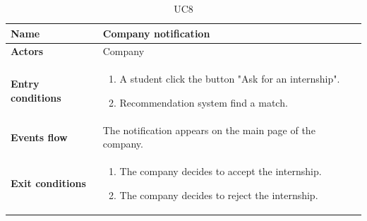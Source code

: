 \begin{table}[H]
\renewcommand\arraystretch{1.25}
    \centering
    \begin{tabular}{|l|p{12 cm}|}
    \hline
    \textbf{Name} & Company notification\\
    \hline
    \textbf{Actors} & Company\\
    \hline
    \textbf{Entry conditions} & 
    \begin{enumerate}[label=(\alph*)]
        \item A student click the button "Ask for an internship".
        \item Recommendation system find a match.
    \end{enumerate}\\
    \hline
    \textbf{Events flow} & The notification appears on the main page of the company.\\  
    \hline
    \textbf{Exit conditions} & 
    \begin{enumerate}[label=(\alph*)]
        \item The company decides to accept the internship.
        \item The company decides to reject the internship.
    \end{enumerate}\\
    \hline
    \end{tabular}
    \caption{UC8}
    \label{UC8}
\end{table}

